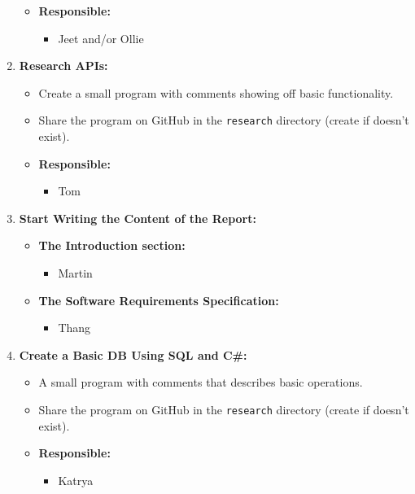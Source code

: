 \documentclass[12pt]{article}
\begin{document}
\begin{enumerate}
  \begin{itemize}
  \tightlist
  \item
    \textbf{Responsible:}

    \begin{itemize}
    \tightlist
    \item
      Jeet and/or Ollie
    \end{itemize}
  \end{itemize}
\item
  \textbf{Research APIs:}

  \begin{itemize}
  \tightlist
  \item
    Create a small program with comments showing off basic
    functionality.
  \item
    Share the program on GitHub in the \texttt{research} directory
    (create if doesn't exist).
  \item
    \textbf{Responsible:}

    \begin{itemize}
    \tightlist
    \item
      Tom
    \end{itemize}
  \end{itemize}
\item
  \textbf{Start Writing the Content of the Report:}

  \begin{itemize}
  \tightlist
  \item
    \textbf{The Introduction section:}

    \begin{itemize}
    \tightlist
    \item
      Martin
    \end{itemize}
  \item
    \textbf{The Software Requirements Specification:}

    \begin{itemize}
    \tightlist
    \item
      Thang
    \end{itemize}
  \end{itemize}
\item
  \textbf{Create a Basic DB Using SQL and C\#:}

  \begin{itemize}
  \tightlist
  \item
    A small program with comments that describes basic operations.
  \item
    Share the program on GitHub in the \texttt{research} directory
    (create if doesn't exist).
  \item
    \textbf{Responsible:}

    \begin{itemize}
    \tightlist
    \item
      Katrya
    \end{itemize}
  \end{itemize}
\end{enumerate}
\end{document}
